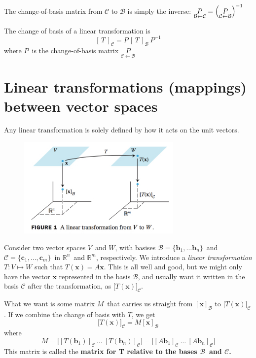 \documentclass[12p,a4paper]{report}
\renewcommand{\b}{\boldsymbol}
\newcommand{\m}{\mathbb}
\begin{document}
The change-of-basis matrix from $\mathcal{C}$ to $\mathcal{B}$ is simply the inverse: $\underset{\mathcal{B}\leftarrow\mathcal{C}}{P} = \qty(\underset{\mathcal{C}\leftarrow\mathcal{B}}{P})^{-1}$

The change of basis of a linear transformation is
\[
    [\,T\,]_\mathcal{C} = P\, [\,T\,]_\mathcal{B}\, P^{-1}
\]
where $P$ is the change-of-basis matrix $\underset{\mathcal{C}\leftarrow\mathcal{B}}{P}$

\section{Linear transformations (mappings) between vector spaces}

Any linear transformation is solely defined by how it acts on the unit vectors.

\begin{figure}
    \includegraphics[width=8cm]{figs/map.jpg}
\end{figure} 
Consider two vector spaces $V$ and $W$, with basises $\mathcal{B} = \{\b b_1,\dots \b b_n\}$ and $\mathcal{C} = \{\b c_1,\dots, \b c_m\}$ in $\m R^n$ and $\m R^m$, respectively. We introduce a \textit{linear transformation} $T: V \mapsto W$ such that $T(\b x) = A\b x$. This is all well and good, but we might only have the vector $\b x$ represented in the basis $\mathcal{B}$, and usually want it written in the basis $\mathcal{C}$ after the transformation, as $\big[T(\b x)\big]_\mathcal{C}$.

What we want is some matrix $M$ that carries us straight from $[\b x]_\mathcal{B}$ to $\big[T(\b x)\big]_\mathcal{C}$. If we combine the change of basis with $T$, we get
\[
    \big[T(\b x)\big]_\mathcal{C} = M[\b x]_\mathcal{B}
\]
where
\[
    M = \Big[[T(\b b_1)]_\mathcal{C}\ \dots \ [T(\b b_n)]_\mathcal{C} \Big]
      = \Big[[A\b b_1]_\mathcal{C}\ \dots \ [A\b b_n]_\mathcal{C} \Big]
\]
This matrix is called the \textbf{matrix for T relative to the bases $\mathcal{B}$ and $\mathcal{C}$.}
\end{document}
